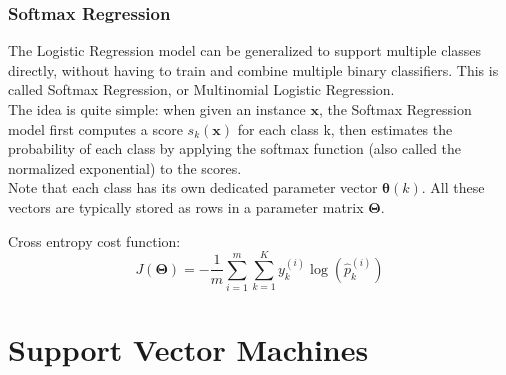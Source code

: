 \documentclass[french]{article}
\begin{document}
\subsubsection{Softmax Regression}

The Logistic Regression model can be generalized to support multiple classes directly, without having to train and combine multiple binary classifiers. This is called Softmax Regression, or Multinomial Logistic Regression.\\

The idea is quite simple: when given an instance $\bm{x}$, the Softmax Regression model first computes a score $s_k(\bm{x})$ for each class k, then estimates the probability of each class by applying the softmax function (also called the normalized exponential) to the scores.\\

Note that each class has its own dedicated parameter vector $\bm{\theta}(k)$. All these vectors are typically stored as rows in a parameter matrix $\bm{\Theta}$.

Cross entropy cost function:
\[J(\bm{\Theta}) = -\frac{1}{m} \sum_{i=1}^m \sum_{k=1}^K y_k^{(i)} \log(\hat p_k^{(i)})\]

\section{Support Vector Machines}
\end{document}
